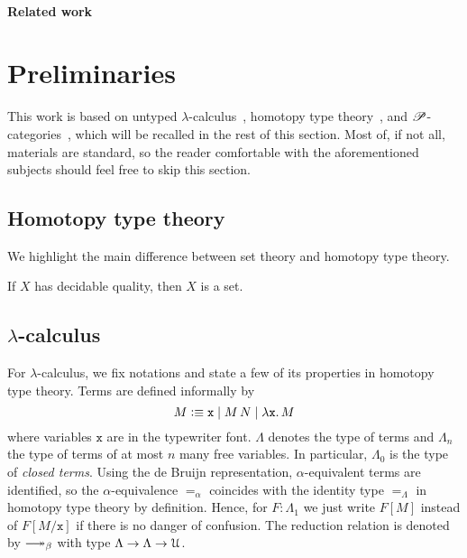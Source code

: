 \documentclass[a4paper,UKenglish,numberwithinsect,cleveref,thm-restate]{lipics-v2021}
\numberwithin{equation}{section}
\theoremstyle{plain}
\begin{document}
\paragraph*{Related work}
\cite{Visser2019,Beklemishev2006}
\cite{Kavvos2020}
\cite{Shamkanov2014,Shamkanov2016a}

\section{Preliminaries}\label{sec:preliminaries}
This work is based on untyped $\lambda$-calculus~\cite{Barendregt1984a}, homotopy type theory~\cite{hottbook}, and $\mathscr{P}$-categories~\cite{Cubric1998a}, which will be recalled in the rest of this section.
Most of, if not all, materials are standard, so the reader comfortable with the aforementioned subjects should feel free to skip this section.

\subsection{Homotopy type theory}
We highlight the main difference between set theory and homotopy type theory.
\begin{theorem}[Hedberg]
  If $X$ has decidable quality, then $X$ is a set.
\end{theorem}

\subsection{\texorpdfstring{$\lambda$}{λ}-calculus}
For $\lambda$-calculus, we fix notations and state a few of its properties in homotopy type theory.
Terms are defined informally by
\[
  M \vcentcolon\equiv \mathtt{x} \mid M\,N \mid \lambda \mathtt{x}.\, M
\]
where variables $\mathtt{x}$ are in the typewriter font.
$\Lambda$ denotes the type of terms and $\Lambda_n$ the type of terms of at most $n$ many free variables.
In particular, $\Lambda_0$ is the type of \emph{closed terms}.
Using the de Bruijn representation, $\alpha$-equivalent terms are identified, so the $\alpha$-equivalence $=_\alpha$ coincides with the identity type $=_\Lambda$ in homotopy type theory by definition.
Hence, for $F : \Lambda_1$ we just write $F[M]$ instead of $F[M/\mathtt{x}]$ if there is no danger of confusion.
The reduction relation is denoted by $\reduce$ with type $\Lambda \to \Lambda \to \mathcal{U}$.
\end{document}
